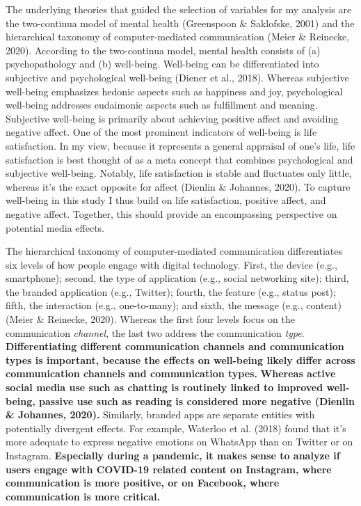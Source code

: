 \documentclass[
  man,mask]{apa7}
\begin{document}
The underlying theories that guided the selection of variables for my analysis are the two-continua model of mental health (Greenspoon \& Saklofske, 2001) and the hierarchical taxonomy of computer-mediated communication (Meier \& Reinecke, 2020).
According to the two-continua model, mental health consists of (a) psychopathology and (b) well-being.
Well-being can be differentiated into subjective and psychological well-being (Diener et al., 2018).
Whereas subjective well-being emphasizes hedonic aspects such as happiness and joy, psychological well-being addresses eudaimonic aspects such as fulfillment and meaning.
Subjective well-being is primarily about achieving positive affect and avoiding negative affect.
One of the most prominent indicators of well-being is life satisfaction.
In my view, because it represents a general appraisal of one's life, life satisfaction is best thought of as a meta concept that combines psychological and subjective well-being.
Notably, life satisfaction is stable and fluctuates only little, whereas it's the exact opposite for affect (Dienlin \& Johannes, 2020).
To capture well-being in this study I thus build on life satisfaction, positive affect, and negative affect.
Together, this should provide an encompassing perspective on potential media effects.

The hierarchical taxonomy of computer-mediated communication differentiates six levels of how people engage with digital technology.
First, the device (e.g., smartphone); second, the type of application (e.g., social networking site); third, the branded application (e.g., Twitter); fourth, the feature (e.g., status post); fifth, the interaction (e.g., one-to-many); and sixth, the message (e.g., content) (Meier \& Reinecke, 2020).
Whereas the first four levels focus on the communication \emph{channel}, the last two address the communication \emph{type}.
\textbf{Differentiating different communication channels and communication types is important, because the effects on well-being likely differ across communication channels and communication types.}
\textbf{Whereas active social media use such as chatting is routinely linked to improved well-being, passive use such as reading is considered more negative (Dienlin \& Johannes, 2020).}
Similarly, branded apps are separate entities with potentially divergent effects.
For example, Waterloo et al. (2018) found that it's more adequate to express negative emotions on WhatsApp than on Twitter or on Instagram.
\textbf{Especially during a pandemic, it makes sense to analyze if users engage with COVID-19 related content on Instagram, where communication is more positive, or on Facebook, where communication is more critical.}
\end{document}
